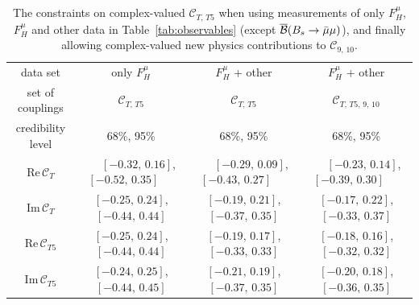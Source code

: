 \documentclass[twocolumn,epjc3]{svjour3}
\numberwithin{equation}{section}
\def \reftab#1{Table~\ref{#1}}
\newcommand{\fred}[1]{{\color{green}{#1}}}
\newcommand{\checked}[1]{{\color{brown}{ {\bf Checked: }{#1}}}}
\renewcommand{\checked}[1]{#1}
\newcommand{\wilson}[2][{}]{\mathcal{C}_{#2}^{\mathrm{#1}}}
\renewcommand{\[}{\big[}
\renewcommand{\]}{\big]}
\renewcommand{\(}{\big(}
\renewcommand{\)}{\big)}
\begin{document}
\begin{table}
  \renewcommand{\arraystretch}{1.3}
  \begin{center}
  \begin{tabular}{cccc}
  \hline
  data set
  & only $F_H^\mu$
  & $F_H^\mu$ + other
  & $F_H^\mu$ + other
  \\
  set of couplings
  & $\wilson{T,\,T5}$
  & $\wilson{T,\,T5}$
  & $\wilson{T,\,T5,\, 9,\,10}$
  \\
  credibility level
  & 68\%, 95\%
  & 68\%, 95\%
  & 68\%, 95\%
  \\
  \hline
  $\mbox{Re}\,\wilson{T}$
  & $\quad$ $[-0.32,\, 0.16]$, $[-0.52,\, 0.35]$ $\quad$
  & $\quad$ $[-0.29,\, 0.09]$, $[-0.43,\, 0.27]$ $\quad$
  & $\quad$ $[-0.23,\, 0.14]$, $[-0.39,\, 0.30]$ $\quad$
  \\
  $\mbox{Im}\,\wilson{T}$
  & $[-0.25,\, 0.24]$, $[-0.44,\, 0.44]$
  & $[-0.19,\, 0.21]$, $[-0.37,\, 0.35]$
  & $[-0.17,\, 0.22]$, $[-0.33,\, 0.37]$
  \\[0.1cm]
  $\mbox{Re}\,\wilson{T5}$
  & $[-0.25,\, 0.24]$, $[-0.44,\, 0.44]$
  & $[-0.19,\, 0.17]$, $[-0.33,\, 0.33]$
  & $[-0.18,\, 0.16]$, $[-0.32,\, 0.32]$
  \\
  $\mbox{Im}\,\wilson{T5}$
  & $[-0.24,\, 0.25]$, $[-0.44,\, 0.45]$
  & $[-0.21,\, 0.19]$, $[-0.37,\, 0.35]$
  & $[-0.20,\, 0.18]$, $[-0.36,\, 0.35]$
  \\
  \hline
  \end{tabular}

  \end{center}

  \renewcommand{\arraystretch}{1.0}
  \caption{
     \label{tab:cTT5:1-dimCLs}
     The constraints on complex-valued $\wilson{T,\,T5}$ when using
     measurements of only $F_H^\mu$, $F_H^\mu$ and other data in
     \reftab{tab:observables} (except $\overline{\cal B}(B_s \to \bar\mu\mu)$), and finally allowing
     complex-valued new physics contributions to $\wilson{9,\,10}$. \checked{} %
   }
\end{table}
\end{document}
